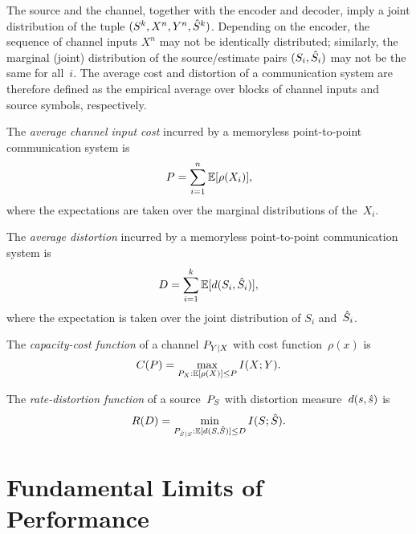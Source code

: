 The source and the channel, together with the encoder and decoder, imply a joint
distribution of the tuple $(S^k, X^n, Y^n, {\hat{S}}^k)$.  Depending on the encoder,
the sequence of channel inputs $X^n$ may not be identically distributed;
similarly, the marginal (joint) distribution of the source/estimate pairs
$(S_i,{\hat{S}}_i)$ may not be the same for all~$i$. The average cost and distortion
of a communication system are therefore defined as the empirical average over
blocks of channel inputs and source symbols, respectively.

\begin{definition}
  \label{def:avgcost}
  The \emph{average channel input cost} incurred by a memoryless point-to-point
  communication system is
  \begin{equation*}
    P = \sum_{i=1}^n \mathbb{E}[\rho(X_i)],
  \end{equation*}
  where the expectations are taken over the marginal distributions of the~$X_i$.
\end{definition}

\begin{definition}
  \label{def:avgdist}
  The \emph{average distortion} incurred by a memoryless point-to-point
  communication system is
  \begin{equation*}
    D = \sum_{i=1}^k \mathbb{E}[d(S_i, {\hat{S}}_i)],
  \end{equation*}
  where the expectation is taken over the joint distribution of $S_i$
  and~${\hat{S}}_i$.
\end{definition}

\begin{definition}
  \label{def:capacity}
  The \emph{capacity-cost function} of a channel $P_{Y|X}$ with cost
  function~$\rho(x)$ is
  \begin{equation*}
    C(P) = \max_{P_X: \mathbb{E}[\rho(X)] \le P} I(X;Y).
  \end{equation*}
\end{definition}

\begin{definition}
  \label{def:ratedistortion}
  The \emph{rate-distortion function} of a source~${P_S}$ with distortion
  measure~$d(s,{\hat{s}})$ is 
  \begin{equation*}
    R(D) = \min_{P_{{\hat{S}}|S}: \mathbb{E}[d(S,{\hat{S}})] \le D} I(S;{\hat{S}}).
  \end{equation*}
\end{definition}


\section{Fundamental Limits of Performance}\label{sec:fundamentallimits}

